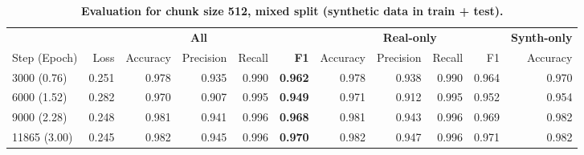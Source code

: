 \begin{table}[H]
\centering
\small
\caption[Evaluation for Chunk Size 512, Mixed Split]{\textbf{Evaluation for chunk size 512, mixed split (synthetic data in train + test).}}
\label{tab:512_mixed}
\begin{tabular}{@{}l *{10}{r} @{}}
\toprule
  & \multicolumn{5}{c}{\textbf{All}} 
  & \multicolumn{4}{c}{\textbf{Real-only}} 
  & \multicolumn{1}{c}{\textbf{Synth-only}} \\
\cmidrule(lr){2-6} \cmidrule(lr){7-10} \cmidrule(lr){11-11}
Step (Epoch) & Loss & Accuracy & Precision & Recall & \textbf{F1}
& Accuracy & Precision & Recall & F1
& Accuracy \\
\midrule
3000 (0.76)  & 0.251 & 0.978 & 0.935 & 0.990 & \textbf{0.962} & 0.978 & 0.938 & 0.990 & 0.964 & 0.970 \\
6000 (1.52)  & 0.282 & 0.970 & 0.907 & 0.995 & \textbf{0.949} & 0.971 & 0.912 & 0.995 & 0.952 & 0.954 \\
9000 (2.28)  & 0.248 & 0.981 & 0.941 & 0.996 & \textbf{0.968} & 0.981 & 0.943 & 0.996 & 0.969 & 0.982 \\
11865 (3.00) & 0.245 & 0.982 & 0.945 & 0.996 & \textbf{0.970} & 0.982 & 0.947 & 0.996 & 0.971 & 0.982 \\
\bottomrule
\end{tabular}
\end{table}
